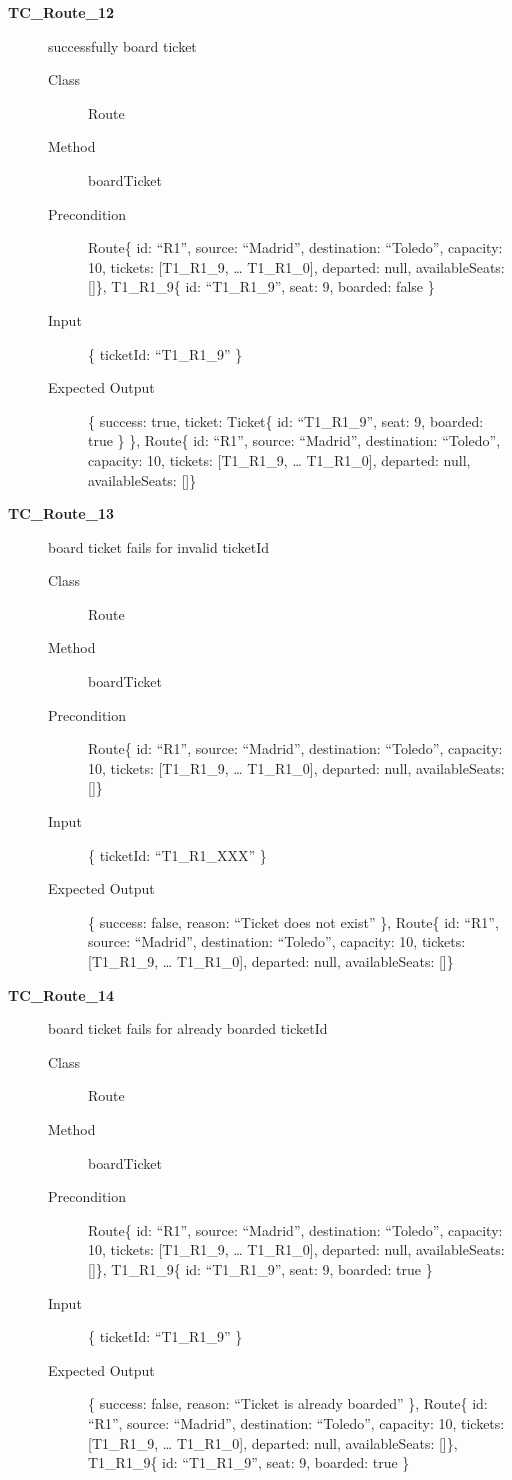 \documentclass[11pt]{article}
\begin{document}
\begin{description}
\item[{\textbf{TC\_Route\_12}}] successfully board ticket
\begin{description}
\item[{Class}] Route
\item[{Method}] boardTicket
\item[{Precondition}] Route\{ id: “R1”, source: “Madrid”, destination: “Toledo”, capacity: 10,  tickets: [T1\_R1\_9, … T1\_R1\_0], departed: null, availableSeats: []\}, T1\_R1\_9\{ id: “T1\_R1\_9”, seat: 9, boarded: false \}
\item[{Input}] \{ ticketId: “T1\_R1\_9” \}
\item[{Expected Output}] \{ success: true, ticket:  Ticket\{ id: “T1\_R1\_9”, seat: 9, boarded: true \} \},
Route\{ id: “R1”, source: “Madrid”, destination: “Toledo”, capacity: 10,  tickets: [T1\_R1\_9, … T1\_R1\_0], departed: null, availableSeats: []\}
\end{description}

\item[{\textbf{TC\_Route\_13}}] board ticket fails for invalid ticketId
\begin{description}
\item[{Class}] Route
\item[{Method}] boardTicket
\item[{Precondition}] Route\{ id: “R1”, source: “Madrid”, destination: “Toledo”, capacity: 10,  tickets: [T1\_R1\_9, … T1\_R1\_0], departed: null, availableSeats: []\}
\item[{Input}] \{ ticketId: “T1\_R1\_XXX” \}
\item[{Expected Output}] \{ success: false, reason: “Ticket does not exist” \},
Route\{ id: “R1”, source: “Madrid”, destination: “Toledo”, capacity: 10,  tickets: [T1\_R1\_9, … T1\_R1\_0], departed: null, availableSeats: []\}
\end{description}

\item[{\textbf{TC\_Route\_14}}] board ticket fails for already boarded ticketId
\begin{description}
\item[{Class}] Route
\item[{Method}] boardTicket
\item[{Precondition}] Route\{ id: “R1”, source: “Madrid”, destination: “Toledo”, capacity: 10,  tickets: [T1\_R1\_9, … T1\_R1\_0], departed: null, availableSeats: []\}, T1\_R1\_9\{ id: “T1\_R1\_9”, seat: 9, boarded: true \}
\item[{Input}] \{ ticketId: “T1\_R1\_9” \}
\item[{Expected Output}] \{ success: false, reason: “Ticket is already boarded” \},
Route\{ id: “R1”, source: “Madrid”, destination: “Toledo”, capacity: 10,  tickets: [T1\_R1\_9, … T1\_R1\_0], departed: null, availableSeats: []\}, T1\_R1\_9\{ id: “T1\_R1\_9”, seat: 9, boarded: true \}
\end{description}


\end{description}
\end{document}

